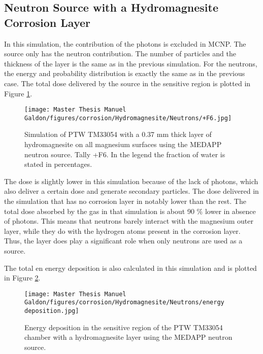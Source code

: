 \clearpage
\subsection{Neutron Source with a Hydromagnesite Corrosion Layer}

In this simulation, the contribution of the photons is excluded in MCNP. The source only has the neutron contribution. The number of particles and the thickness of the layer is the same as in the previous simulation. For the neutrons, the energy and probability distribution is exactly the same as in the previous case. The total dose delivered by the source in the sensitive region is plotted in Figure \ref{fig:PTW-33053 with hydromagnesite. Tally +F6. Only neutrons}.

\begin{figure}[!h]
  \centering
  \texttt{[image: Master Thesis Manuel Galdon/figures/corrosion/Hydromagnesite/Neutrons/+F6.jpg]}
  \caption{Simulation of PTW TM33054 with a 0.37 \unit{\milli\meter} thick layer of hydromagnesite on all magnesium surfaces using the MEDAPP neutron source. Tally +F6. In the legend the fraction of water is stated in percentages.}
  \label{fig:PTW-33053 with hydromagnesite. Tally +F6. Only neutrons}
\end{figure}

The dose is slightly lower in this simulation because of the lack of photons, which also deliver a certain dose and generate secondary particles. The dose delivered in the simulation that has no corrosion layer in notably lower than the rest. The total dose absorbed by the gas in that simulation is about 90 $\%$ lower in absence of photons. This means that neutrons barely interact with the magnesium outer layer, while they do with the hydrogen atoms present in the corrosion layer. Thus, the layer does play a significant role when only neutrons are used as a source.
\newpage

\newpage
The total en energy deposition is also calculated in this simulation and is plotted in Figure \ref{fig:PTW-33053 with hydromagnesite. Energy deposition. Neutrons}.
\begin{figure}[!h]
  \centering
  \texttt{[image: Master Thesis Manuel Galdon/figures/corrosion/Hydromagnesite/Neutrons/energy deposition.jpg]}
  \caption{Energy deposition in the sensitive region of the PTW TM33054 chamber with a  hydromagnesite layer using the MEDAPP neutron source.}
  \label{fig:PTW-33053 with hydromagnesite. Energy deposition. Neutrons}
\end{figure}

